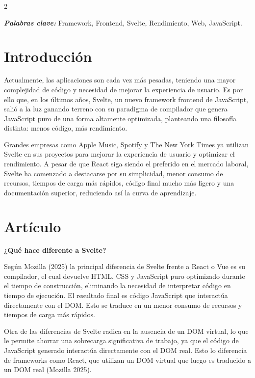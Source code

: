 \documentclass[12pt,spanish,Letterpaper,openany]{book}
\begin{document}
\begin {multicols}{2}

\textbf{\emph{Palabras clave:}} Framework, Frontend, Svelte, Rendimiento, Web, JavaScript.

\section{Introducción}\label{introducciuxf3n-5}

Actualmente, las aplicaciones son cada vez más pesadas, teniendo una mayor complejidad de código y necesidad de mejorar la experiencia de usuario. Es por ello que, en los últimos años, Svelte, un nuevo framework frontend de JavaScript, salió a la luz ganando terreno con su paradigma de compilador que genera JavaScript puro de una forma altamente optimizada, planteando una filosofía distinta: menos código, más rendimiento.

Grandes empresas como Apple Music, Spotify y The New York Times ya utilizan Svelte en sus proyectos para mejorar la experiencia de usuario y optimizar el rendimiento. A pesar de que React siga siendo el preferido en el mercado laboral, Svelte ha comenzado a destacarse por su simplicidad, menor consumo de recursos, tiempos de carga más rápidos, código final mucho más ligero y una documentación superior, reduciendo así la curva de aprendizaje.

\section{Artículo}\label{artuxedculo-5}

\bigskip

\textbf{¿Qué hace diferente a Svelte?}

Según Mozilla (2025) la principal diferencia de Svelte frente a React o Vue es su compilador, el cual devuelve HTML, CSS y JavaScript puro optimizado durante el tiempo de construcción, eliminando la necesidad de interpretar código en tiempo de ejecución. El resultado final es código JavaScript que interactúa directamente con el DOM. Esto se traduce en un menor consumo de recursos y tiempos de carga más rápidos.

Otra de las diferencias de Svelte radica en la ausencia de un DOM virtual, lo que le permite ahorrar una sobrecarga significativa de trabajo, ya que el código de JavaScript generado interactúa directamente con el DOM real. Esto lo diferencia de frameworks como React, que utilizan un DOM virtual que luego es traducido a un DOM real (Mozilla 2025).


\end{multicols}
\end{document}
